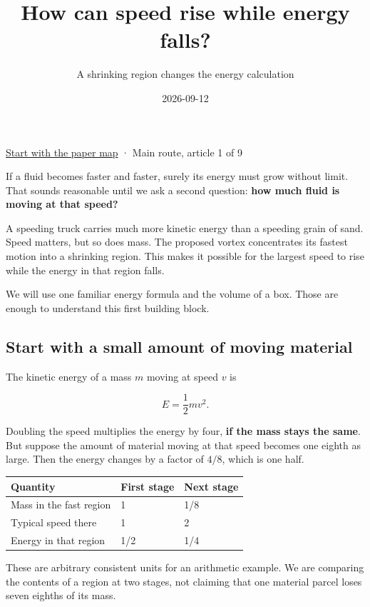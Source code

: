 \documentclass[
  english,
  11pt,
]{article}
\title{How can speed rise while energy falls?}
\subtitle{A shrinking region changes the energy calculation}
\author{}
\date{2026-09-12}
\newcounter{none} %
\begin{document}
\maketitle


\href{../paper-map/article.html}{Start with the paper map} · Main route,
article 1 of 9

If a fluid becomes faster and faster, surely its energy must grow
without limit. That sounds reasonable until we ask a second question:
\textbf{how much fluid is moving at that speed?}

A speeding truck carries much more kinetic energy than a speeding grain
of sand. Speed matters, but so does mass. The proposed vortex
concentrates its fastest motion into a shrinking region. This makes it
possible for the largest speed to rise while the energy in that region
falls.

We will use one familiar energy formula and the volume of a box. Those
are enough to understand this first building block.

\subsection{Start with a small amount of moving
material}\label{start-with-a-small-amount-of-moving-material}

The kinetic energy of a mass \(m\) moving at speed \(v\) is

\[
E=\frac12 mv^2.
\]

Doubling the speed multiplies the energy by four, \textbf{if the mass
stays the same}. But suppose the amount of material moving at that speed
becomes one eighth as large. Then the energy changes by a factor of
\(4/8\), which is one half.

{\def\LTcaptype{none} %
\begin{longtable}[]{@{}lll@{}}
\toprule\noalign{}
Quantity & First stage & Next stage \\
\midrule\noalign{}
\endhead
\bottomrule\noalign{}
\endlastfoot
Mass in the fast region & 1 & 1/8 \\
Typical speed there & 1 & 2 \\
Energy in that region & 1/2 & 1/4 \\
\end{longtable}
}

These are arbitrary consistent units for an arithmetic example. We are
comparing the contents of a region at two stages, not claiming that one
material parcel loses seven eighths of its mass.
\end{document}
